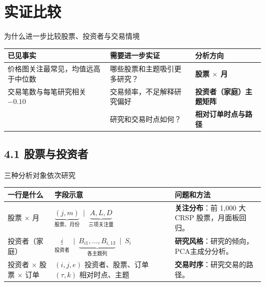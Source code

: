 \section{实证比较}

\begin{frame}[label=empirical-why]{为什么进一步比较股票、投资者与交易情境}
  \small
  \setlength{\tabcolsep}{5pt}
  \renewcommand{\arraystretch}{1.35}
  \begin{tabularx}{\linewidth}{@{}L{.29\linewidth}YL{.24\linewidth}@{}}
    \toprule{}
    \textbf{已见事实} & \textbf{需要进一步实证} & \textbf{分析方向}\\\midrule
    价格图关注最常见，均值远高于中位数 & 哪些股票和主题吸引更多研究？ & \textcolor{wine}{\textbf{股票 \(\times\) 月}}\\
    交易笔数与每笔研究相关 \(\mathbf{-0.10}\) & 交易频率，不足解释研究偏好 & \textcolor{wine}{\textbf{投资者（家庭）主题矩阵}}\\
     & 研究和交易时点如何？ & \textcolor{wine}{\textbf{相对订单时点与路径}}\\\bottomrule
  \end{tabularx}\par\medskip
\end{frame}

\subsection{4.1 股票与投资者}
\begin{frame}[label=slices]{三种分析对象依次研究}
  \small
  \begin{tabularx}{\linewidth}{@{}L{.24\linewidth}YY@{}}
    \toprule 一行是什么 & 字段示意 & 问题和方法\\\midrule
    股票 \(\times\) 月 & \(\underbrace{(j,m)}_{\text{股票、月份}}\ \mid\ \underbrace{A,L,D}_{\text{三项关注量}}\) &
      \textbf{关注分布}：前 1,000 大 CRSP 股票，月面板回归。\\\midrule
    投资者（家庭） & \(\underbrace{i}_{\text{投资者}}\ \mid\ \underbrace{B_{i1},\ldots,B_{i,13}}_{\text{各主题列}}\ \mid\ S_i\) &
      \textbf{研究风格}：研究的倾向，PCA主成分分析。\\\midrule
    投资者 \(\times\) 股票 \(\times\) 订单 &
      \((i,j,e)\) 投资者、股票、订单\newline \((\tau,k)\) 相对时点、主题 &
      \textbf{交易时序}：研究交易的路径。\\
    \bottomrule
  \end{tabularx}
\end{frame}

